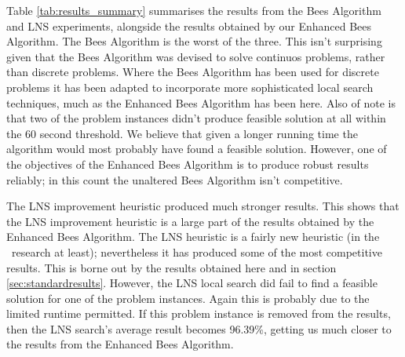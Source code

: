 Table \ref{tab:results_summary} summarises the results from the Bees Algorithm and LNS experiments, alongside the results obtained by our Enhanced Bees Algorithm. The Bees Algorithm is the worst of the three. This isn't surprising given that the Bees Algorithm was devised to solve continuos problems, rather than discrete problems. Where the Bees Algorithm has been used for discrete problems it has been adapted to incorporate more sophisticated local search techniques, much as the Enhanced Bees Algorithm has been here. Also of note is that two of the problem instances didn't produce feasible solution at all within the 60 second threshold. We believe that given a longer running time the algorithm would most probably have found a feasible solution. However, one of the objectives of the Enhanced Bees Algorithm is to produce robust results reliably; in this count the unaltered Bees Algorithm isn't competitive. 

The LNS improvement heuristic produced much stronger results. This shows that the LNS improvement heuristic is a large part of the results obtained by the Enhanced Bees Algorithm. The LNS heuristic is a fairly new heuristic (in the \VRP\ research at least); nevertheless it has produced some of the most competitive results. This is borne out by the results obtained here and in section \ref{sec:standardresults}. However, the LNS local search did fail to find a feasible solution for one of the problem instances. Again this is probably due to the limited runtime permitted. If this problem instance is removed from the results, then the LNS search's average result becomes 96.39\%, getting us much closer to the results from the Enhanced Bees Algorithm.

